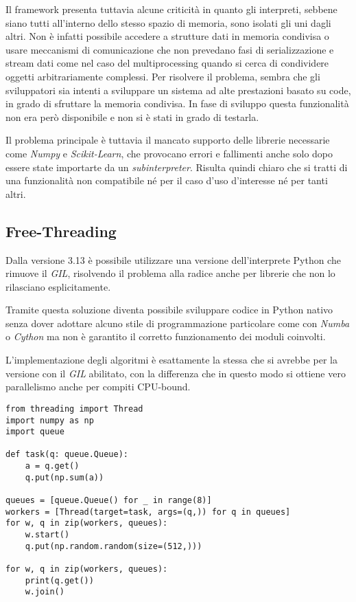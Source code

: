 Il framework presenta tuttavia alcune criticità in quanto gli interpreti,
sebbene siano tutti all'interno dello stesso spazio di memoria, sono isolati
gli uni dagli altri. Non è infatti possibile accedere a strutture dati in
memoria condivisa o usare meccanismi di comunicazione che non prevedano fasi
di serializzazione e stream dati come nel caso del multiprocessing quando si
cerca di condividere oggetti arbitrariamente complessi. Per risolvere il
problema, sembra che gli sviluppatori sia intenti a sviluppare un sistema ad
alte prestazioni basato su code, in grado di sfruttare la memoria condivisa. In
fase di sviluppo questa funzionalità non era però disponibile e non si è stati
in grado di testarla. %

Il problema principale è tuttavia il mancato supporto delle librerie necessarie
come \textit{Numpy} e \textit{Scikit-Learn}, che provocano errori e fallimenti
anche solo dopo essere state importarte da un \textit{subinterpreter}. Risulta
quindi chiaro che si tratti di una funzionalità non compatibile né per il caso
d'uso d'interesse né per tanti altri.

\subsection*{Free-Threading}

Dalla versione 3.13 è possibile utilizzare una versione dell'interprete Python
che rimuove il \textit{GIL}, risolvendo il problema alla radice anche per
librerie che non lo rilasciano esplicitamente.

Tramite questa soluzione diventa possibile sviluppare codice in Python nativo
senza dover adottare alcuno stile di programmazione particolare come con
\textit{Numba} o \textit{Cython} ma non è garantito il corretto funzionamento
dei moduli coinvolti.

L'implementazione degli algoritmi è esattamente la stessa che si avrebbe per la
versione con il \textit{GIL} abilitato, con la differenza che in questo modo si
ottiene vero parallelismo anche per compiti CPU-bound.

\begin{lstlisting}[caption={Esempio multithreading}]
from threading import Thread
import numpy as np
import queue

def task(q: queue.Queue):
	a = q.get()
	q.put(np.sum(a))

queues = [queue.Queue() for _ in range(8)]
workers = [Thread(target=task, args=(q,)) for q in queues]
for w, q in zip(workers, queues):
	w.start()
	q.put(np.random.random(size=(512,)))

for w, q in zip(workers, queues):
	print(q.get())
	w.join()
\end{lstlisting}


